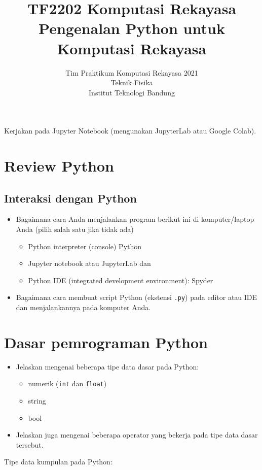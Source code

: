 \documentclass[a4paper,11pt,bahasa]{article} %
\newcommand{\txtinline}[1]{\texttt{#1}}
\begin{document}
\title{%
{\small TF2202 Komputasi Rekayasa}\\
Pengenalan Python untuk Komputasi Rekayasa
}
\author{Tim Praktikum Komputasi Rekayasa 2021\\
Teknik Fisika\\
Institut Teknologi Bandung}
\date{}
\maketitle

Kerjakan pada Jupyter Notebook (mengunakan JupyterLab atau Google Colab).

\section{Review Python}

\subsection{Interaksi dengan Python}

\begin{itemize}
\item Bagaimana cara Anda menjalankan program berikut ini di komputer/laptop Anda
(pilih salah satu jika tidak ada)
  \begin{itemize}
  \item Python interpreter (console) Python
  \item Jupyter notebook atau JupyterLab dan 
  \item Python IDE (integrated development environment): Spyder
  \end{itemize}
\item Bagaimana cara membuat script Python (ekstensi \txtinline{.py}) pada editor
atau IDE dan menjalankannya pada komputer Anda.
\end{itemize}


\section{Dasar pemrograman Python}
\begin{itemize}
\item Jelaskan mengenai beberapa tipe data dasar pada Python:
  \begin{itemize}
  \item numerik (\txtinline{int} dan \txtinline{float})
  \item string
  \item bool
  \end{itemize}
\item Jelaskan juga mengenai beberapa operator yang bekerja pada tipe data dasar tersebut.
\end{itemize}
Tipe data kumpulan pada Python:
\end{document}
